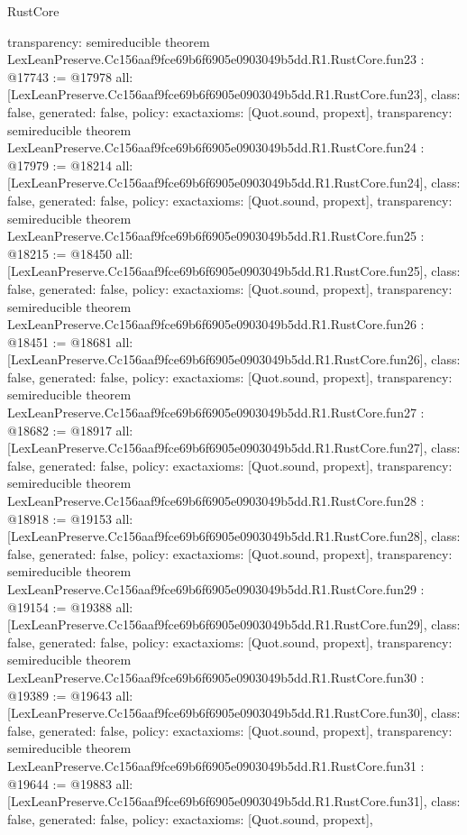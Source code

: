 \begin{lexlean}{RustCore}
\begin{coremodule}
{  transparency: semireducible
}
theorem LexLeanPreserve.Cc156aaf9fce69b6f6905e0903049b5dd.R1.RustCore.fun23 : @17743 := @17978 {
  all: [LexLeanPreserve.Cc156aaf9fce69b6f6905e0903049b5dd.R1.RustCore.fun23],
  class: false,
  generated: false,
  policy: exact{axioms: [Quot.sound, propext]},
  transparency: semireducible
}
theorem LexLeanPreserve.Cc156aaf9fce69b6f6905e0903049b5dd.R1.RustCore.fun24 : @17979 := @18214 {
  all: [LexLeanPreserve.Cc156aaf9fce69b6f6905e0903049b5dd.R1.RustCore.fun24],
  class: false,
  generated: false,
  policy: exact{axioms: [Quot.sound, propext]},
  transparency: semireducible
}
theorem LexLeanPreserve.Cc156aaf9fce69b6f6905e0903049b5dd.R1.RustCore.fun25 : @18215 := @18450 {
  all: [LexLeanPreserve.Cc156aaf9fce69b6f6905e0903049b5dd.R1.RustCore.fun25],
  class: false,
  generated: false,
  policy: exact{axioms: [Quot.sound, propext]},
  transparency: semireducible
}
theorem LexLeanPreserve.Cc156aaf9fce69b6f6905e0903049b5dd.R1.RustCore.fun26 : @18451 := @18681 {
  all: [LexLeanPreserve.Cc156aaf9fce69b6f6905e0903049b5dd.R1.RustCore.fun26],
  class: false,
  generated: false,
  policy: exact{axioms: [Quot.sound, propext]},
  transparency: semireducible
}
theorem LexLeanPreserve.Cc156aaf9fce69b6f6905e0903049b5dd.R1.RustCore.fun27 : @18682 := @18917 {
  all: [LexLeanPreserve.Cc156aaf9fce69b6f6905e0903049b5dd.R1.RustCore.fun27],
  class: false,
  generated: false,
  policy: exact{axioms: [Quot.sound, propext]},
  transparency: semireducible
}
theorem LexLeanPreserve.Cc156aaf9fce69b6f6905e0903049b5dd.R1.RustCore.fun28 : @18918 := @19153 {
  all: [LexLeanPreserve.Cc156aaf9fce69b6f6905e0903049b5dd.R1.RustCore.fun28],
  class: false,
  generated: false,
  policy: exact{axioms: [Quot.sound, propext]},
  transparency: semireducible
}
theorem LexLeanPreserve.Cc156aaf9fce69b6f6905e0903049b5dd.R1.RustCore.fun29 : @19154 := @19388 {
  all: [LexLeanPreserve.Cc156aaf9fce69b6f6905e0903049b5dd.R1.RustCore.fun29],
  class: false,
  generated: false,
  policy: exact{axioms: [Quot.sound, propext]},
  transparency: semireducible
}
theorem LexLeanPreserve.Cc156aaf9fce69b6f6905e0903049b5dd.R1.RustCore.fun30 : @19389 := @19643 {
  all: [LexLeanPreserve.Cc156aaf9fce69b6f6905e0903049b5dd.R1.RustCore.fun30],
  class: false,
  generated: false,
  policy: exact{axioms: [Quot.sound, propext]},
  transparency: semireducible
}
theorem LexLeanPreserve.Cc156aaf9fce69b6f6905e0903049b5dd.R1.RustCore.fun31 : @19644 := @19883 {
  all: [LexLeanPreserve.Cc156aaf9fce69b6f6905e0903049b5dd.R1.RustCore.fun31],
  class: false,
  generated: false,
  policy: exact{axioms: [Quot.sound, propext]},
}
\end{coremodule}
\end{lexlean}

